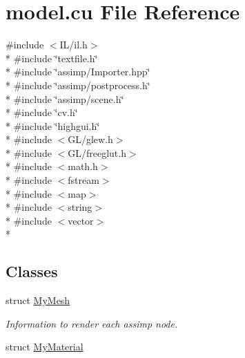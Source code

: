 \hypertarget{model_8cu}{\section{model.\-cu File Reference}
\label{model_8cu}
}
{\ttfamily \#include $<$I\-L/il.\-h$>$}\\*
{\ttfamily \#include \char`\"{}textfile.\-h\char`\"{}}\\*
{\ttfamily \#include \char`\"{}assimp/\-Importer.\-hpp\char`\"{}}\\*
{\ttfamily \#include \char`\"{}assimp/postprocess.\-h\char`\"{}}\\*
{\ttfamily \#include \char`\"{}assimp/scene.\-h\char`\"{}}\\*
{\ttfamily \#include \char`\"{}cv.\-h\char`\"{}}\\*
{\ttfamily \#include \char`\"{}highgui.\-h\char`\"{}}\\*
{\ttfamily \#include $<$G\-L/glew.\-h$>$}\\*
{\ttfamily \#include $<$G\-L/freeglut.\-h$>$}\\*
{\ttfamily \#include $<$math.\-h$>$}\\*
{\ttfamily \#include $<$fstream$>$}\\*
{\ttfamily \#include $<$map$>$}\\*
{\ttfamily \#include $<$string$>$}\\*
{\ttfamily \#include $<$vector$>$}\\*
\subsection*{Classes}
\begin{DoxyCompactItemize}
\item 
struct \hyperlink{structMyMesh}{My\-Mesh}
\begin{DoxyCompactList}\small\item\em Information to render each assimp node. \end{DoxyCompactList}\item 
struct \hyperlink{structMyMaterial}{My\-Material}
\end{DoxyCompactItemize}
